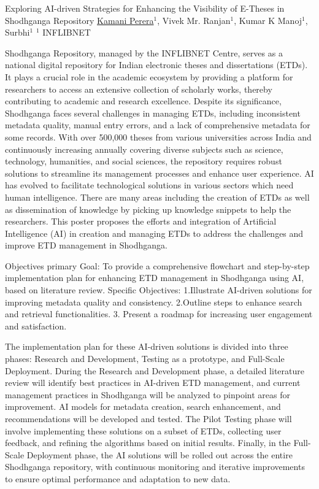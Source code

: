 
    \begin{abstract_online}{Exploring AI-driven Strategies for Enhancing the Visibility of E-Theses in Shodhganga Repository}{%
    \underline{Kamani Perera}$^{1}$, Vivek Mr. Ranjan$^{1}$, Kumar K Manoj$^{1}$, Surbhi$^{1}$}{%
    }{
    $^1$ INFLIBNET%
}

Shodhganga Repository, managed by the INFLIBNET Centre, serves as a national digital repository for Indian electronic theses and dissertations (ETDs). It plays a crucial role in the academic ecosystem by providing a platform for researchers to access an extensive collection of scholarly works, thereby contributing to academic and research excellence. Despite its significance, Shodhganga faces several challenges in managing ETDs, including inconsistent metadata quality, manual entry errors, and a lack of comprehensive metadata for some records. With over 500,000 theses from various universities across India and continuously increasing annually covering diverse subjects such as science, technology, humanities, and social sciences, the repository requires robust solutions to streamline its management processes and enhance user experience. AI has evolved to facilitate technological solutions in various sectors which need human intelligence. There are many areas including the creation of ETDs as well as dissemination of knowledge by picking up knowledge snippets to help the researchers. This poster proposes the efforts and integration of Artificial Intelligence (AI) in creation and managing ETDs to address the challenges and improve ETD management in Shodhganga.

	Objectives
	primary Goal: To provide a comprehensive flowchart and step-by-step implementation plan for enhancing ETD management in Shodhganga using AI, based on literature review.
Specific Objectives:
    1.Illustrate AI-driven solutions for improving metadata quality and consistency.
    2.Outline steps to enhance search and retrieval functionalities.
    3. Present a roadmap for increasing user engagement and satisfaction.

The implementation plan for these AI-driven solutions is divided into three phases: Research and Development, Testing as a prototype, and Full-Scale Deployment. During the Research and Development phase, a detailed literature review will identify best practices in AI-driven ETD management, and current management practices in Shodhganga will be analyzed to pinpoint areas for improvement. AI models for metadata creation, search enhancement, and recommendations will be developed and tested. The Pilot Testing phase will involve implementing these solutions on a subset of ETDs, collecting user feedback, and refining the algorithms based on initial results. Finally, in the Full-Scale Deployment phase, the AI solutions will be rolled out across the entire Shodhganga repository, with continuous monitoring and iterative improvements to ensure optimal performance and adaptation to new data.


\end{abstract_online}
